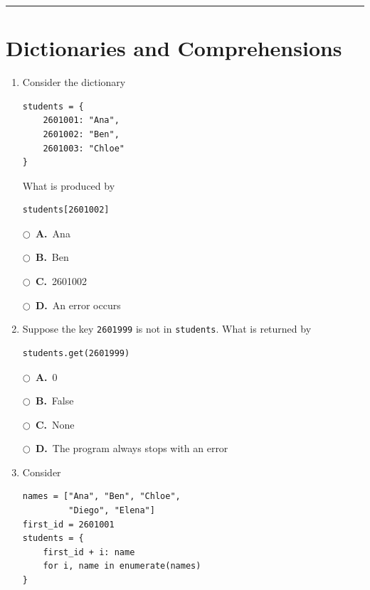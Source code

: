 \documentclass[11pt]{article}
\newcommand{\choice}[2]{%
    \par\noindent
    \(\bigcirc\)\ \textbf{#1.}\ #2
}
\begin{document}
\normalsize

\vspace{0.15cm}
\hrule
\vspace{0.25cm}

\twocolumn

\section*{Dictionaries and Comprehensions}

\begin{enumerate}

\item Consider the dictionary

\begin{verbatim}
students = {
    2601001: "Ana",
    2601002: "Ben",
    2601003: "Chloe"
}
\end{verbatim}

What is produced by

\begin{verbatim}
students[2601002]
\end{verbatim}

\choice{A}{Ana}
\choice{B}{Ben}
\choice{C}{2601002}
\choice{D}{An error occurs}

\item Suppose the key \texttt{2601999} is not in \texttt{students}. What is returned by

\begin{verbatim}
students.get(2601999)
\end{verbatim}

\choice{A}{0}
\choice{B}{False}
\choice{C}{None}
\choice{D}{The program always stops with an error}

\item Consider

\begin{verbatim}
names = ["Ana", "Ben", "Chloe",
         "Diego", "Elena"]
first_id = 2601001
students = {
    first_id + i: name
    for i, name in enumerate(names)
}
\end{verbatim}


\end{enumerate}
\end{document}
